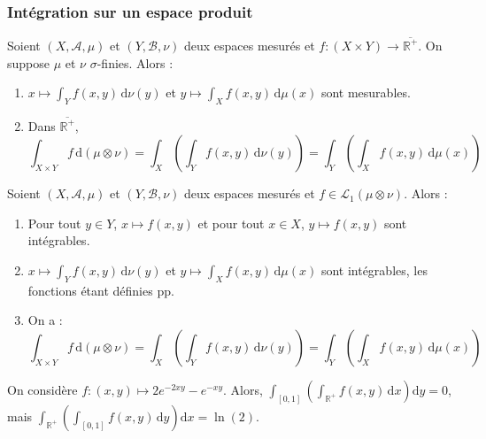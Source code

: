   \subsubsection{Intégration sur un espace produit}


  \begin{theorem}
    Soient $(X, \mathcal{A}, \mu)$ et $(Y, \mathcal{B}, \nu)$ deux espaces mesurés et $f : (X \times Y) \rightarrow \overline{\mathbb{R}^+}$. On suppose $\mu$ et $\nu$ $\sigma$-finies. Alors :
    \begin{enumerate}[label=(\roman*)]
      \item $x \mapsto \int_Y f(x,y) \, \mathrm{d}\nu(y)$ et $y \mapsto \int_X f(x,y) \, \mathrm{d}\mu(x)$ sont mesurables.
      \item Dans $\overline{\mathbb{R}^+}$,
      \[ \int_{X \times Y} f \, \mathrm{d}(\mu \otimes \nu) = \int_X \left( \int_Y f(x,y) \, \mathrm{d}\nu(y) \right) = \int_Y \left( \int_X f(x,y) \, \mathrm{d}\mu(x) \right) \]
    \end{enumerate}
  \end{theorem}

  \begin{theorem}
    Soient $(X, \mathcal{A}, \mu)$ et $(Y, \mathcal{B}, \nu)$ deux espaces mesurés et $f \in \mathcal{L}_1 (\mu \otimes \nu)$. Alors :
    \begin{enumerate}[label=(\roman*)]
      \item Pour tout $y \in Y$, $x \mapsto f(x,y)$ et pour tout $x \in X$, $y \mapsto f(x,y)$ sont intégrables.
      \item $x \mapsto \int_Y f(x,y) \, \mathrm{d}\nu(y)$ et $y \mapsto \int_X f(x,y) \, \mathrm{d}\mu(x)$ sont intégrables, les fonctions étant définies pp.
      \item On a :
      \[ \int_{X \times Y} f \, \mathrm{d}(\mu \otimes \nu) = \int_X \left( \int_Y f(x,y) \, \mathrm{d}\nu(y) \right) = \int_Y \left( \int_X f(x,y) \, \mathrm{d}\mu(x) \right) \]
    \end{enumerate}
  \end{theorem}

  \begin{cexample}
    On considère $f : (x,y) \mapsto 2e^{-2xy} - e^{-xy}$. Alors, $\int_{[0,1]} \left( \int_{\mathbb{R}^+} f(x,y) \, \mathrm{d}x \right) \mathrm{d}y = 0$, mais $\int_{\mathbb{R}^+} \left( \int_{[0,1]} f(x,y) \, \mathrm{d}y \right) \mathrm{d}x = \ln(2)$.
  \end{cexample}

